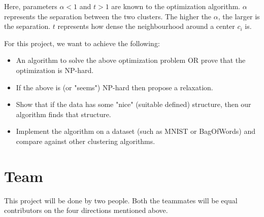 \documentclass{article}
\begin{document}
Here, parameters $\alpha < 1$ and $t > 1$ are known to the optimization algorithm. $\alpha$ represents the separation between the two clusters. The higher the $\alpha$, the larger is the separation. $t$ represents how dense the neighbourhood around a center $c_i$ is. 

For this project, we want to achieve the following:
\begin{itemize}
\item An algorithm to solve the above optimization problem OR prove that the optimization is NP-hard. 
\item If the above is (or "seems") NP-hard then propose a relaxation.
\item Show that if the data has some "nice" (suitable defined) structure, then our algorithm finds that structure.
\item Implement the algorithm on a dataset (such as MNIST or BagOfWords) and compare against other clustering algorithms.
\end{itemize}


\section{Team}
This project will be done by two people. Both the teammates will be equal contributors on the four directions mentioned above.



\end{document}
